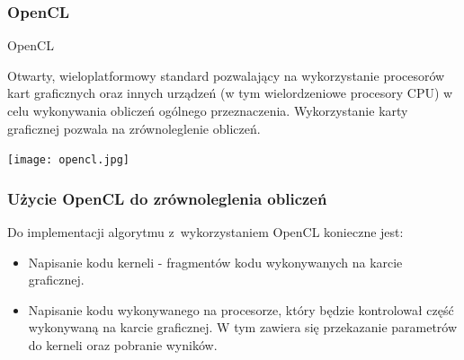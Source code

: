 \begin{frame}
	\frametitle{OpenCL}
	\begin{block}{OpenCL}
	\begin{tiny}
		Otwarty, wieloplatformowy standard pozwalający na wykorzystanie procesorów kart graficznych oraz innych urządzeń (w tym wielordzeniowe procesory CPU) w celu wykonywania obliczeń ogólnego przeznaczenia. Wykorzystanie karty graficznej pozwala na zrównoleglenie obliczeń.
	\end{tiny}
	\end{block}
	\begin{center}
	\texttt{[image: opencl.jpg]}
	\end{center}
\end{frame}


\begin{frame}
	\frametitle{Użycie OpenCL do zrównoleglenia obliczeń}

	Do implementacji algorytmu z~wykorzystaniem OpenCL konieczne jest:
	\begin{itemize}
		\item Napisanie kodu kerneli - fragmentów kodu wykonywanych na karcie graficznej.
		\item Napisanie kodu wykonywanego na procesorze, który będzie kontrolował część wykonywaną na karcie graficznej. W tym zawiera się przekazanie parametrów do kerneli oraz pobranie wyników.
	\end{itemize}

\end{frame}



